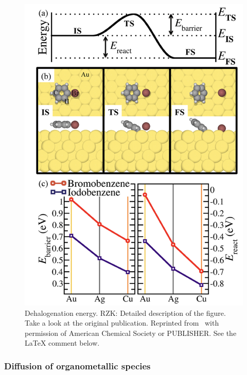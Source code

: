 \documentclass[aps,reprint,amsmath,amssymb]{revtex4-2}
\begin{document}
\begin{figure}[htb]
\centering
\includegraphics[width=0.98\columnwidth]{Fig/dehalogentaion.png}
\caption{Dehalogenation energy. RZK: Detailed description of the figure. Take a look at the original publication. Reprinted from~\cite{RZK} with permission of American Chemical Society or PUBLISHER. See the LaTeX comment below.}
\label{fig:dehalo}
\end{figure}

\subsubsection{Diffusion of organometallic species}
\end{document}
